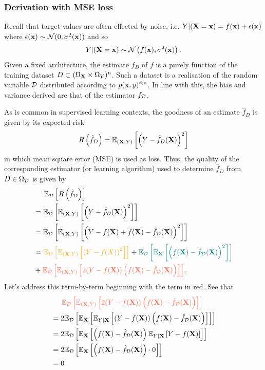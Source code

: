 \documentclass[11pt]{article}
\begin{document}
\subsubsection{Derivation with MSE loss}
Recall that target values are often effected by noise, i.e. $Y|(\mathbf{X}=\mathbf{x})=f(\mathbf{x})+\epsilon(\mathbf{x})$ where $\epsilon(\mathbf{x})\sim\mathcal{N}(0,\sigma^2(\mathbf{x}))$ and so
$$
Y|(\mathbf{X}=\mathbf{x})
\sim
\mathcal{N}\left(f(\mathbf{x}), \sigma^2(\mathbf{x})\right).
$$
Given a fixed architecture, the estimate $\hat{f}_D$ of $f$ is a purely function of the training dataset $D\subset(\Omega_{\mathbf{X}}\times\Omega_Y)^n$. Such a dataset is a realisation of the random variable $\mathcal{D}$ distributed according to $p(\mathbf{x},y)^{\otimes n}$. In line with this, the bias and variance derived are that of the estimator $f_{\mathcal{D}}$.

As is common in supervised learning contexts, the goodness of an estimate $\hat{f}_D$ is given by its expected risk
$$
R\left(\hat{f}_D\right)
=
\mathbb{E}_{(\mathbf{X},Y)}\left[\left(Y-\hat{f}_D(\mathbf{X})\right)^2\right]
$$
in which mean square error (MSE) is used as loss. Thus, the quality of the corresponding estimator (or learning algorithm) used to determine $\hat{f}_{D}$ from $D\in\Omega_{\mathcal{D}}$ is given by
\begin{align*}
    &\hspace{14.52pt}
    \E_{\D}\l[R\l(\hat{f}_{\D}\r)\r]\\
    &=
    \E_{\D}\l[\E_{(\X,Y)}\l[\l(Y-\hat{f}_{\D}(\X)\r)^2\r]\r]\nonumber\\
    &=
    \E_{\D}\l[\E_{(\X,Y)}\l[\l(Y-f(\X)+f(\X)-\hat{f}_{\D}(\X)\r)^2\r]\r]\nonumber\\
    &=
    \textcolor{myYellow}{\E_{\D}\l[\E_{(\X,Y)}\l[\l(Y-f(X)\r)^2\r]\r]}+
    \textcolor{myGreen}{\E_{\D}\l[\E_\X\l[\l(f(\X)-\hat{f}_{\D}(\X)\r)^2\r]\r]}\\
    &+\textcolor{myLightRed}{\E_{\D}\l[\E_{(\X,Y)}\l[2(Y-f(\X))\l(f(\X)-\hat{f}_{\D}(\X)\r)\r]\r]}.
\end{align*}
Let's address this term-by-term beginning with the term in red. See that
\begin{align*}
    &\hspace{14.52pt}
    \textcolor{myLightRed}{\E_{\D}\l[\E_{(\X,Y)}\l[2(Y-f(\X))\l(f(\X)-\hat{f}_{\D}(\X)\r)\r]\r]}\\
    &=
    2\E_{\D}\l[\E_\X\l[\E_{Y|\X}\l[(Y-f(\X))\l(f(\X)-\hat{f}_{\D}(\X)\r)\r]\r]\r]\\
    &=
    2\E_{\D}\l[\E_\X\l[\l(f(\X)-\hat{f}_{\D}(\X)\r)\E_{Y|\X}\l[Y-f(\X)\r]\r]\r]\\
    &=
    2\E_{\D}\l[\E_\X\l[\l(f(\X)-\hat{f}_{\D}(\X)\r)\cdot0\r]\r]\\
    &=
    0
\end{align*}
\end{document}
